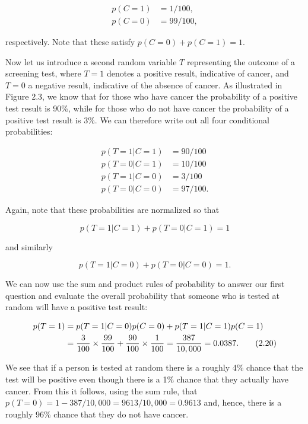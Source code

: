 \documentclass{article}
\begin{document}
\begin{align}
p(C=1) &= 1/100, \tag{2.12} \\
p(C=0) &= 99/100, \tag{2.13}
\end{align}

respectively. Note that these satisfy $p(C=0)+p(C=1)=1$.

Now let us introduce a second random variable $T$ representing the outcome of a screening test, where $T = 1$ denotes a positive result, indicative of cancer, and $T = 0$ a negative result, indicative of the absence of cancer. As illustrated in Figure 2.3, we know that for those who have cancer the probability of a positive test result is 90\%, while for those who do not have cancer the probability of a positive test result is 3\%. We can therefore write out all four conditional probabilities:

\begin{align}
p(T=1|C=1) &= 90/100 \tag{2.14} \\
p(T=0|C=1) &= 10/100 \tag{2.15} \\
p(T=1|C=0) &= 3/100 \tag{2.16} \\
p(T=0|C=0) &= 97/100. \tag{2.17}
\end{align}

Again, note that these probabilities are normalized so that

\begin{equation}
p(T=1|C=1)+p(T=0|C=1)=1 \tag{2.18}
\end{equation}

and similarly

\begin{equation}
p(T=1|C=0)+p(T=0|C=0)=1. \tag{2.19}
\end{equation}

We can now use the sum and product rules of probability to answer our first question and evaluate the overall probability that someone who is tested at random will have a positive test result:

\begin{align}
p(T=1) &= p(T=1|C=0)p(C=0)+p(T=1|C=1)p(C=1) \notag \\
&= \frac{3}{100}\times\frac{99}{100}+\frac{90}{100}\times\frac{1}{100}=\frac{387}{10,000}=0.0387. \tag{2.20}
\end{align}

We see that if a person is tested at random there is a roughly 4\% chance that the test will be positive even though there is a 1\% chance that they actually have cancer. From this it follows, using the sum rule, that $p(T=0)=1-387/10,000=9613/10,000=0.9613$ and, hence, there is a roughly 96\% chance that they do not have cancer.
\end{document}
